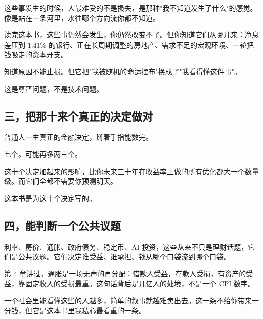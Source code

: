 这些事发生的时候，人最难受的不是损失，是那种"我不知道发生了什么"的感觉。像是站在一条河里，水往哪个方向流你都不知道。

读完这本书，这些事仍然会发生，你仍然改变不了。但你知道它们从哪儿来：净息差压到 1.41\% 的银行、正在长周期调整的房地产、需求不足的宏观环境、一轮把钱吸走的资本开支。

知道原因不能止损。但它把"我被随机的命运摆布"换成了"我看得懂这件事"。

这是尊严问题，不是技术问题。

\subsection{三，把那十来个真正的决定做对}

普通人一生真正的金融决定，掰着手指能数完。

\begin{flowlist}
\end{flowlist}

七个。可能再多两三个。

这十个决定加起来的影响，比你未来三十年在收益率上做的所有优化都大一个数量级。而它们全都不需要你预测明天。

这本书是为这十个决定写的。

\subsection{四，能判断一个公共议题}

利率、房价、通胀、政府债务、稳定币、AI 投资，这些从来不只是理财话题，它们是公共议题。它们决定谁受益、谁承担、钱从哪个口袋流到哪个口袋。

第 4 章讲过，通胀是一场无声的再分配：借款人受益，存款人受损，有资产的受益，靠固定收入的受损最重。这句话背后是几亿人的处境，不是一个 CPI 数字。

一个社会里能看懂这些的人越多，简单的叙事就越难卖出去。这一条不给你带来一分钱，但它是这本书里我私心最看重的一条。

